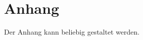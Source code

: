 %
\appendix
\renewcommand{\theequation}{A-\arabic{equation}}
\renewcommand{\thetable}{A-\arabic{table}}
%
\chapter{Anhang}
%
Der Anhang kann beliebig gestaltet werden.
%
